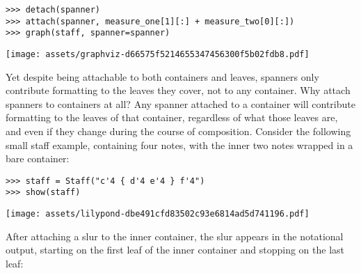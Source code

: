 \begin{comment}
<abjad>
detach(spanner)
attach(spanner, measure_one[1][:] + measure_two[0][:])
graph(staff, spanner=spanner)
</abjad>
\end{comment}

\begin{abjadbookoutput}
\begin{singlespacing}
\vspace{-0.5\baselineskip}
\begin{lstlisting}
>>> detach(spanner)
>>> attach(spanner, measure_one[1][:] + measure_two[0][:])
>>> graph(staff, spanner=spanner)
\end{lstlisting}
\noindent\texttt{[image: assets/graphviz-d66575f5214655347456300f5b02fdb8.pdf]}
\end{singlespacing}
\end{abjadbookoutput}

\noindent Yet despite being attachable to both containers and leaves, spanners
only contribute formatting to the leaves they cover, not to any container. Why
attach spanners to containers at all? Any spanner attached to a container will
contribute formatting to the leaves of that container, regardless of what those
leaves are, and even if they change during the course of composition. Consider
the following small staff example, containing four notes, with the inner two
notes wrapped in a bare container:

\begin{comment}
<abjad>
staff = Staff("c'4 { d'4 e'4 } f'4")
show(staff)
</abjad>
\end{comment}

\begin{abjadbookoutput}
\begin{singlespacing}
\vspace{-0.5\baselineskip}
\begin{lstlisting}
>>> staff = Staff("c'4 { d'4 e'4 } f'4")
>>> show(staff)
\end{lstlisting}
\noindent\texttt{[image: assets/lilypond-dbe491cfd83502c93e6814ad5d741196.pdf]}
\end{singlespacing}
\end{abjadbookoutput}

\noindent After attaching a slur to the inner container, the slur appears in
the notational output, starting on the first leaf of the inner container and
stopping on the last leaf:

\begin{comment}
<abjad>
attach(Slur(), staff[1])
show(staff)
</abjad>
\end{comment}

